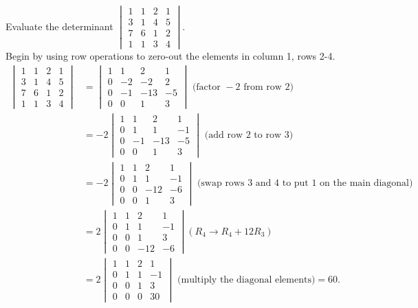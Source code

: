 \documentclass[../main.tex]{subfiles}
\begin{document}
\begin{example}
Evaluate the determinant \(\begin{vmatrix}
      1 & 1 & 2 & 1\\
      3 & 1 & 4 & 5\\
      7 & 6 & 1 & 2\\
      1 & 1 & 3 & 4
    \end{vmatrix}
    \).\\
    Begin by using row operations to zero-out the elements in column 1, rows 2-4.
    \begin{equation*}
      \begin{aligned}
        \begin{vmatrix}
          1 & 1 & 2 & 1\\
          3 & 1 & 4 & 5\\
          7 & 6 & 1 & 2\\
          1 & 1 & 3 & 4
        \end{vmatrix}
        &=\begin{vmatrix}
          1 & 1 & 2 & 1\\
          0 & -2 & -2 & 2\\
          0 & -1 & -13 & -5\\
          0 & 0 & 1 & 3
        \end{vmatrix}\text{ (factor }-2\text{ from row }2\text{)}\\
        &= -2\begin{vmatrix}
          1 & 1 & 2 & 1\\
          0 & 1 & 1 & -1\\
          0 & -1 & -13 & -5\\
          0 & 0 & 1 & 3
        \end{vmatrix}\text{ (add row } 2\text{ to row }3\text{)}\\
        &= -2\begin{vmatrix}
          1 & 1 & 2 & 1\\
          0 & 1 & 1 & -1\\
          0 & 0 & -12 & -6\\
          0 & 0 & 1 & 3
        \end{vmatrix}\text{ (swap rows } 3 \text{ and } 4 \text{ to put 1 on the main diagonal)}\\
        &= 2\begin{vmatrix}
          1 & 1 & 2 & 1\\
          0 & 1 & 1 & -1\\
          0 & 0 & 1 & 3\\
          0 & 0 & -12 & -6
        \end{vmatrix} (R_4 \rightarrow R_4 + 12R_3)\\
        &= 2\begin{vmatrix}
          1 & 1 & 2 & 1\\
          0 & 1 & 1 & -1\\
          0 & 0 & 1 & 3\\
          0 & 0 & 0 & 30
        \end{vmatrix} \text{ (multiply the diagonal elements)}=60.
      \end{aligned}
    \end{equation*}
    

\end{example}
\end{document}
